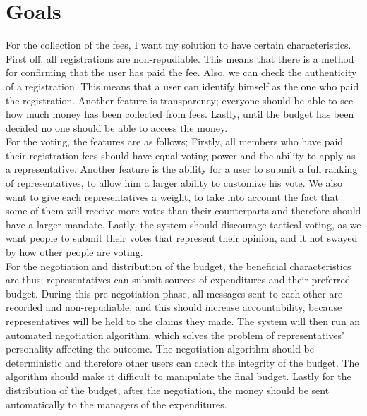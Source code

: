 \section{Goals}
For the collection of the fees, I want my solution to have certain characteristics. First off, all registrations are non-repudiable. This means that there is a method for confirming that the user has paid the fee. Also, we can check the authenticity of a registration. This means that a user can identify himself as the one who paid the registration. Another feature is transparency; everyone should be able to see how much money has been collected from fees. Lastly, until the budget has been decided no one should be able to access the money. \\
For the voting, the features are as follows; Firstly, all members who have paid their registration fees should have equal voting power and the ability to apply as a representative. Another feature is the ability for a user to submit a full ranking of representatives, to allow him a larger ability to customize his vote. We also want to give each representatives a weight, to take into account the fact that some of them will receive more votes than their counterparts and therefore should have a larger mandate. Lastly, the system should discourage tactical voting, as we want people to submit their votes that represent their opinion, and it not swayed by how other people are voting. \\
For the negotiation and distribution of the budget, the beneficial characteristics are thus; representatives can submit sources of expenditures and their preferred budget. During this pre-negotiation phase, all messages sent to each other are recorded and non-repudiable, and this should increase accountability, because representatives will be held to the claims they made. The system will then run an automated negotiation algorithm, which solves the problem of representatives’ personality affecting the outcome. The negotiation algorithm should be deterministic and therefore other users can check the integrity of the budget. The algorithm should make it difficult to manipulate the final budget. Lastly for the distribution of the budget, after the negotiation, the money should be sent automatically to the managers of the expenditures.  







